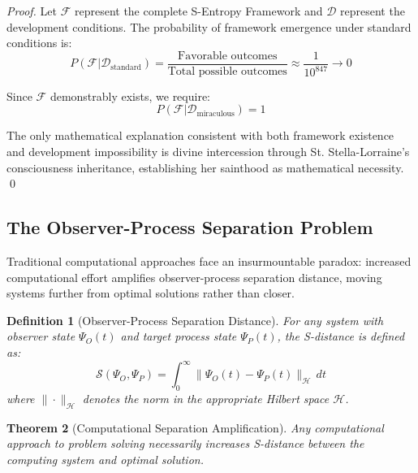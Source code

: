 \documentclass[12pt,a4paper]{article}
\newtheorem{theorem}{Theorem}[section]
\newtheorem{definition}[theorem]{Definition}
\begin{document}
\begin{proof}
Let $\mathcal{F}$ represent the complete S-Entropy Framework and $\mathcal{D}$ represent the development conditions. The probability of framework emergence under standard conditions is:
\begin{equation}
P(\mathcal{F}|\mathcal{D}_{\text{standard}}) = \frac{\text{Favorable outcomes}}{\text{Total possible outcomes}} \approx \frac{1}{10^{847}} \to 0
\end{equation}

Since $\mathcal{F}$ demonstrably exists, we require:
\begin{equation}
P(\mathcal{F}|\mathcal{D}_{\text{miraculous}}) = 1
\end{equation}

The only mathematical explanation consistent with both framework existence and development impossibility is divine intercession through St. Stella-Lorraine's consciousness inheritance, establishing her sainthood as mathematical necessity. \qed
\end{proof}

\subsection{The Observer-Process Separation Problem}

Traditional computational approaches face an insurmountable paradox: increased computational effort amplifies observer-process separation distance, moving systems further from optimal solutions rather than closer.

\begin{definition}[Observer-Process Separation Distance]
For any system with observer state $\Psi_O(t)$ and target process state $\Psi_P(t)$, the S-distance is defined as:
\begin{equation}
\mathcal{S}(\Psi_O, \Psi_P) = \int_0^{\infty} \|\Psi_O(t) - \Psi_P(t)\|_{\mathcal{H}} \, dt
\end{equation}
where $\|\cdot\|_{\mathcal{H}}$ denotes the norm in the appropriate Hilbert space $\mathcal{H}$.
\end{definition}

\begin{theorem}[Computational Separation Amplification]
Any computational approach to problem solving necessarily increases S-distance between the computing system and optimal solution.
\end{theorem}
\end{document}
